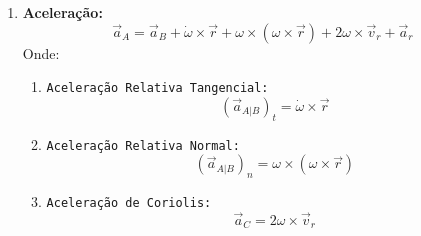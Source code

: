 \documentclass{article}
\begin{document}
\begin{enumerate}[rightmargin = \leftmargin, noitemsep]
                    \item \textbf{Aceleração:}
                        \begin{equation}
                            \boxed{
                                \vec{a}_{A} = \vec{a}_{B} + \dot{\omega}\times\vec{r} + \omega\times(\omega\times\vec{r}) + 2\omega\times\vec{v}_{r} + \vec{a}_{r}
                            }
                        \end{equation}
                    Onde:
                        \begin{enumerate}[rightmargin = \leftmargin, noitemsep]
                            \item \texttt{Aceleração Relativa Tangencial:}
                                \begin{equation}
                                    \boxed{
                                        (\vec{a}_{A|B})_{t} = \dot{\omega}\times\vec{r}
                                    }
                                \end{equation}

                            \item \texttt{Aceleração Relativa Normal:}
                                \begin{equation}
                                    \boxed{
                                        (\vec{a}_{A|B})_{n} = \omega\times(\omega\times\vec{r})
                                    }
                                \end{equation}

                            \item \texttt{Aceleração de Coriolis:}
                                \begin{equation}
                                    \boxed{
                                        \vec{a}_{C} = 2\omega\times\vec{v}_{r}
                                    }
                                \end{equation}
                        \end{enumerate}
                \end{enumerate}
\end{document}
